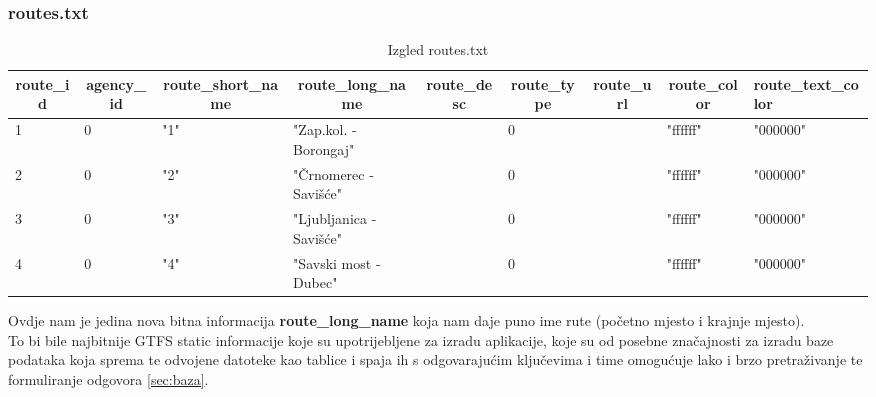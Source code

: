 \documentclass[zavrsnirad]{fer}
\begin{document}
\subsubsection{routes.txt}

\begin{table}[htb]
	\begin{adjustbox}{width=\columnwidth,center}
	\begin{tabular}{l|l|l|l|l|l|l|l|l}
		\hline
		\multicolumn{1}{c|}{\textbf{route\_id}} & \multicolumn{1}{c|}{\textbf{agency\_id}} & \multicolumn{1}{c|}{\textbf{route\_short\_name}} & \multicolumn{1}{c|}{\textbf{route\_long\_name}} & \multicolumn{1}{c|}{\textbf{route\_desc}} & \multicolumn{1}{c|}{\textbf{route\_type}} & \multicolumn{1}{c|}{\textbf{route\_url}} & \multicolumn{1}{c|}{\textbf{route\_color}} & \textbf{route\_text\_color} \\ \hline
		1 & 0 & "1" & "Zap.kol. - Borongaj" &  & 0 &  & "ffffff" & "000000" \\ \hline
		2 & 0 & "2" & "Črnomerec - Savišće" &  & 0 &  & "ffffff" & "000000" \\ \hline
		3 & 0 & "3" & "Ljubljanica -Savišće" &  & 0 &  & "ffffff" & "000000" \\ \hline
		4 & 0 & "4" & "Savski most - Dubec" &  & 0 &  & "ffffff" & "000000" \\ \hline
	\end{tabular}
	\end{adjustbox}
	\caption{Izgled routes.txt}
	\label{tbl:routes}
\end{table}

Ovdje nam je jedina nova bitna informacija \textbf{route\_long\_name} koja nam daje puno ime rute (početno mjesto i krajnje mjesto).\\
To bi bile najbitnije GTFS static informacije koje su upotrijebljene za izradu aplikacije, koje su od posebne značajnosti za izradu baze podataka koja sprema te odvojene datoteke kao tablice i spaja ih s odgovarajućim ključevima i time omogućuje lako i brzo pretraživanje te formuliranje odgovora \ref{sec:baza}.

\newpage
\end{document}
